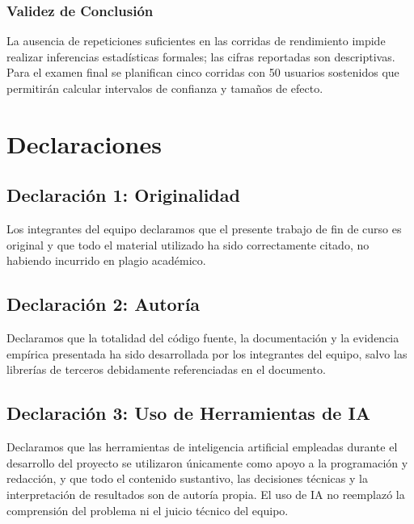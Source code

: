 \documentclass[
11pt,
a4paper,
]{report}
\begin{document}
	\hypertarget{validez-de-conclusion}{%
		\subsection{Validez de Conclusión}\label{validez-de-conclusion}}
	
	La ausencia de repeticiones suficientes en las corridas de rendimiento impide realizar inferencias estadísticas formales; las cifras reportadas son descriptivas. Para el examen final se planifican cinco corridas con 50 usuarios sostenidos que permitirán calcular intervalos de confianza y tamaños de efecto.
	
	\hypertarget{declaraciones}{%
		\chapter{Declaraciones}\label{declaraciones}}
	
	\hypertarget{declaracion-1-originalidad}{%
		\section{Declaración 1: Originalidad}\label{declaracion-1-originalidad}}
	
	Los integrantes del equipo declaramos que el presente trabajo de fin de curso es original y que todo el material utilizado ha sido correctamente citado, no habiendo incurrido en plagio académico.
	
	\hypertarget{declaracion-2-autoria}{%
		\section{Declaración 2: Autoría}\label{declaracion-2-autoria}}
	
	Declaramos que la totalidad del código fuente, la documentación y la evidencia empírica presentada ha sido desarrollada por los integrantes del equipo, salvo las librerías de terceros debidamente referenciadas en el documento.
	
	\hypertarget{declaracion-3-uso-de-ia}{%
		\section{Declaración 3: Uso de Herramientas de IA}\label{declaracion-3-uso-de-ia}}
	
	Declaramos que las herramientas de inteligencia artificial empleadas durante el desarrollo del proyecto se utilizaron únicamente como apoyo a la programación y redacción, y que todo el contenido sustantivo, las decisiones técnicas y la interpretación de resultados son de autoría propia. El uso de IA no reemplazó la comprensión del problema ni el juicio técnico del equipo.
	
\end{document}
